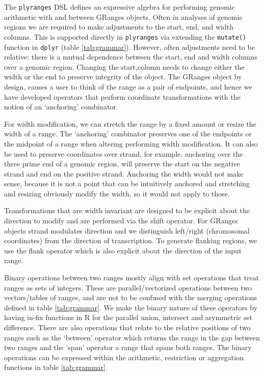 \documentclass[10pt,letterpaper]{article}
\begin{document}
The \texttt{plyranges} DSL defines an expressive algebra for performing
genomic arithmetic with and between GRanges objects. Often in analyses
of genomic regions we are required to make adjustments to the start,
end, and width columns. This is supported directly in \texttt{plyranges}
via extending the \texttt{mutate()} function in \texttt{dplyr} (table
\ref{tab:grammar}). However, often adjustments need to be relative:
there is a mutual dependence between the start, end and width columns
over a genomic region. Changing the start,column needs to change either
the width or the end to preserve integrity of the object. The GRanges
object by design, causes a user to think of the range as a pair of
endpoints, and hence we have developed operators that perform coordinate
transformations with the notion of an `anchoring' combinator.

For width modification, we can stretch the range by a fixed amount or
resize the width of a range. The `anchoring' combinator preserves one of
the endpoints or the midpoint of a range when altering performing width
modification. It can also be used to preserve coordinates over strand,
for example, anchoring over the three prime end of a genomic region,
will preserve the start on the negative strand and end on the positive
strand. Anchoring the width would not make sense, because it is not a
point that can be intuitively anchored and stretching and resizing
obviously modify the width, so it would not apply to those.

Transformations that are width invariant are designed to be explicit
about the direction to modify and are performed via the shift operator.
For GRanges objects strand modulates direction and we distinguish
left/right (chromosomal coordinates) from the direction of
transcription. To generate flanking regions, we use the flank operator
which is also explicit about the direction of the input range.

Binary operations between two ranges mostly align with set operations
that treat ranges as sets of integers. These are parallel/vectorized
operations between two vectors/tables of ranges, and are not to be
confused with the merging operations defined in table \ref{tab:grammar}.
We make the binary nature of these operators by having in-fix functions
in R for the parallel union, intersect and asymmetric set difference.
There are also operations that relate to the relative positions of two
ranges such as the `between' operator which returns the range in the gap
between two ranges and the `span' operator a range that spans both
ranges. The binary operations can be expressed within the arithmetic,
restriction or aggregation functions in table \ref{tab:grammar}.
\end{document}
